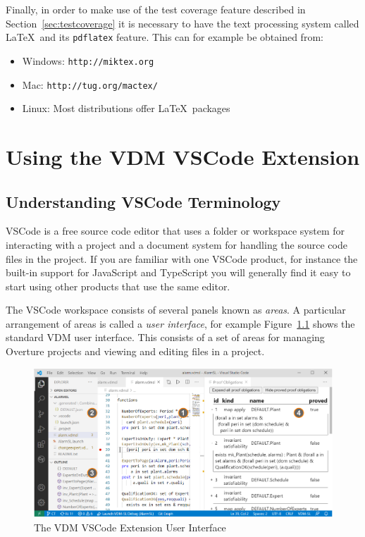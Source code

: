 \documentclass{overturerepchap}
\newcommand{\url}[1]{\texttt{#1}}
\begin{document}
Finally, in order to make use of the
test coverage feature described in Section~\ref{sec:testcoverage} it is
necessary to have the text processing system called \LaTeX\ and its
\texttt{pdflatex} feature. This can for example be obtained from:

\begin{itemize}
    \item Windows: \url{http://miktex.org}
    \item Mac: \url{http://tug.org/mactex/}
    \item Linux: Most distributions offer \LaTeX\ packages
\end{itemize}

\let\cleardoublepage\clearpage


\chapter{Using the VDM VSCode Extension}\label{sec:vdmsupport}

\section{Understanding VSCode Terminology}

VSCode is a free source code editor that uses a folder or workspace system for interacting with a project and a document system for handling the source code files in the project.
If you are familiar with one VSCode product, for instance the built-in support for JavaScript and TypeScript you will generally find it easy to start
using other products that use the same editor. 


The VSCode workspace
consists of several panels known as \emph{areas}. 
A particular arrangement of areas
is called a \emph{user interface}, for example
Figure~\ref{fig:userguire:VSCodeUserInterface} shows the standard
VDM user interface. This consists of a set of areas for managing
Overture projects and viewing and editing files in a
project.

\begin{figure}[!h]
\begin{center}
  \includegraphics[width=\textwidth]{snapshots/VDM VSCode Extension Perspective.png}
  \caption[labelInTOC]{The VDM VSCode Extension User Interface}
  \label{fig:userguire:VSCodeUserInterface}
\end{center}
\end{figure}
\end{document}
